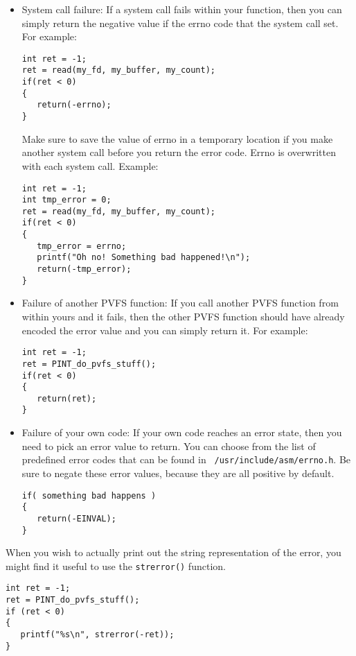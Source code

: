 \documentclass[11pt, letterpaper]{article}
\begin{document}
\begin{itemize}
\item System call failure:  If a system call fails within your function,
then you can simply return the negative value if the errno code that the
system call set.  For example:
\begin{verbatim}
int ret = -1;
ret = read(my_fd, my_buffer, my_count);
if(ret < 0)
{
   return(-errno);
}
\end{verbatim}

Make sure to save the value of errno in a temporary location if you make
another system call before you return the error code.  Errno is
overwritten with each system call.  Example:

\begin{verbatim}
int ret = -1;
int tmp_error = 0;
ret = read(my_fd, my_buffer, my_count);
if(ret < 0)
{
   tmp_error = errno;
   printf("Oh no! Something bad happened!\n");
   return(-tmp_error);
}
\end{verbatim}


\item Failure of another PVFS function:  If you call another PVFS
function from within yours and it fails, then the other PVFS function
should have already encoded the error value and you can simply return
it.  For example:
\begin{verbatim}
int ret = -1;
ret = PINT_do_pvfs_stuff();
if(ret < 0)
{
   return(ret);
}
\end{verbatim}

\item Failure of your own code:  If your own code reaches an error
state, then you need to pick an error value to return.  You can choose
from the list of predefined error codes that can be found in {\tt
/usr/include/asm/errno.h}.  Be sure to negate these error values,
because they are all positive by default.
\begin{verbatim}
if( something bad happens )
{
   return(-EINVAL);
}
\end{verbatim}

\end{itemize}

When you wish to actually print out the string representation of the
error, you might find it useful to use the {\tt strerror()} function.
\begin{verbatim}
int ret = -1;
ret = PINT_do_pvfs_stuff();
if (ret < 0)
{
   printf("%s\n", strerror(-ret));
}
\end{verbatim}
\end{document}
